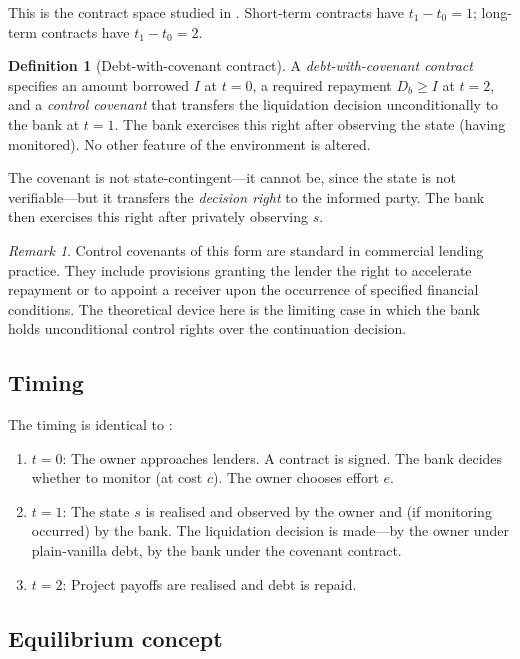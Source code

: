\documentclass[12pt,a4paper]{article}
\theoremstyle{plain}
\theoremstyle{definition}
\newtheorem{definition}[theorem]{Definition}
\theoremstyle{remark}
\newtheorem{remark}[theorem]{Remark}
\begin{document}
This is the contract space studied in \citet{Rajan1992}. Short-term contracts have
$t_1 - t_0 = 1$; long-term contracts have $t_1 - t_0 = 2$.

\begin{definition}[Debt-with-covenant contract]
\label{d:covenant}
A \emph{debt-with-covenant contract} specifies an amount borrowed $I$ at $t=0$, a
required repayment $D_b \geq I$ at $t=2$, and a \emph{control covenant} that
transfers the liquidation decision unconditionally to the bank at $t=1$. The bank
exercises this right after observing the state (having monitored). No other feature of
the environment is altered.
\end{definition}

The covenant is not state-contingent---it cannot be, since the state is not
verifiable---but it transfers the \emph{decision right} to the informed party. The
bank then exercises this right after privately observing $s$.

\begin{remark}
\label{r:covenant_standard}
Control covenants of this form are standard in commercial lending practice. They
include provisions granting the lender the right to accelerate repayment or to
appoint a receiver upon the occurrence of specified financial conditions. The
theoretical device here is the limiting case in which the bank holds unconditional
control rights over the continuation decision.
\end{remark}

\subsection{Timing}

The timing is identical to \citet{Rajan1992}:
\begin{enumerate}[nosep]
\item $t=0$: The owner approaches lenders. A contract is signed. The bank decides
  whether to monitor (at cost $c$). The owner chooses effort $e$.
\item $t=1$: The state $s$ is realised and observed by the owner and (if monitoring
  occurred) by the bank. The liquidation decision is made---by the owner under
  plain-vanilla debt, by the bank under the covenant contract.
\item $t=2$: Project payoffs are realised and debt is repaid.
\end{enumerate}

\subsection{Equilibrium concept}
\end{document}
